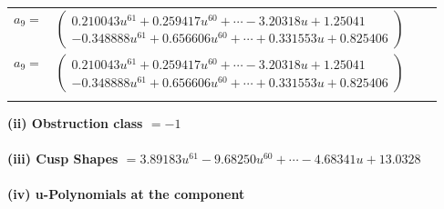 \documentclass[1p]{elsarticle_modified}
\theoremstyle{definition}
\begin{document}
\begin{tabular}{m{7pt} m{180pt} m{7pt} m{180pt} }
\flushright $a_{9}=$&$\begin{pmatrix}0.210043 u^{61}+0.259417 u^{60}+\cdots-3.20318 u+1.25041\\-0.348888 u^{61}+0.656606 u^{60}+\cdots+0.331553 u+0.825406\end{pmatrix}$\\ \flushright $a_{9}=$&$\begin{pmatrix}0.210043 u^{61}+0.259417 u^{60}+\cdots-3.20318 u+1.25041\\-0.348888 u^{61}+0.656606 u^{60}+\cdots+0.331553 u+0.825406\end{pmatrix}$\\&\end{tabular}
\flushleft \textbf{(ii) Obstruction class $= -1$}\\~\\
\flushleft \textbf{(iii) Cusp Shapes $= 3.89183 u^{61}-9.68250 u^{60}+\cdots-4.68341 u+13.0328$}\\~\\
\newpage\renewcommand{\arraystretch}{1}
\flushleft \textbf{(iv) u-Polynomials at the component}\newline \\
\end{document}
